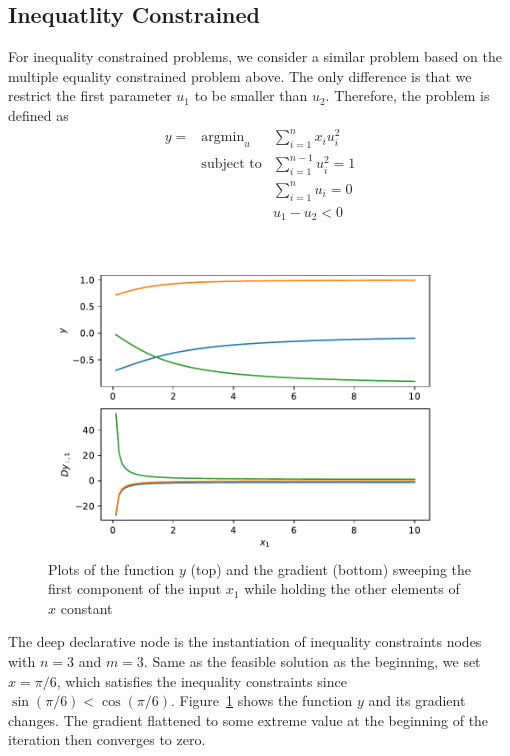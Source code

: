 \subsection{Inequatlity Constrained}
For inequality constrained problems, we consider a similar problem based on the multiple equality constrained problem above. The only difference is that we restrict the first parameter $u_1$ to be smaller than $u_2$. Therefore, the problem is defined as
\begin{equation}
    \begin{array}{rll}
        y =& \text{argmin}_u & \sum_{i=1}^{n} x_i u_i^{2} \\
        & \text{subject to} & \sum_{i=1}^{n-1} u_i^2 = 1 \\
        & & \sum_{i=1}^{n} u_i = 0 \\
        & & u_1 - u_2 < 0
    \end{array}
\end{equation}
\begin{figure}[t]
    \label{fig:ineq-eg}
    \centering
    \includegraphics[page=1,width=.8\textwidth]{figs/multiple_inequality_example.pdf} 
    \caption{Plots of the function $y$ (top) and the gradient (bottom) sweeping the first component of the input $x_1$ while holding the other elements of $x$ constant}
\end{figure}
\par The deep declarative node is the instantiation of inequality constraints nodes with $n=3$ and $m=3$. Same as the feasible solution as the beginning, we set $x=\pi / 6$, which satisfies the inequality constraints since $\sin (\pi/6) < \cos (\pi/6)$. Figure~\ref{fig:ineq-eg} shows the function $y$ and its gradient changes. The gradient flattened to some extreme value at the beginning of the iteration then converges to zero. 

